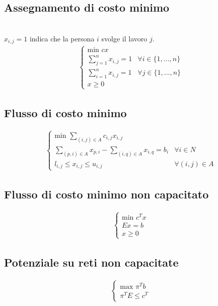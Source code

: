 \documentclass[fleqn,12pt]{article}
\begin{document}
\subsection{Assegnamento di costo minimo} \\
    $x_{i,j} = 1$ indica che la persona $i$ svolge il lavoro $j$.
    \begin{gather*}
    \begin{cases}
        \text{min} \,\, cx \\
        \sum\limits_{j=1}^{n} x_{i,j} = 1 & \forall i \in \{1,...,n\} \\
        \sum\limits_{i=1}^{n} x_{i,j} = 1 & \forall j \in \{1,...,n\} \\
        x \ge 0
    \end{cases}
    \end{gather*}
\subsection{Flusso di costo minimo}
    \begin{gather*}
    \begin{cases}
        \text{min} \,\, \sum\limits_{(i,j) \in A} c_{i,j}x_{i,j} \\
        \sum\limits_{(p,i) \in A} x_{p,i} - \sum\limits_{(i,q) \in A} x_{i,q}
        = b_i & \forall i \in N \\
        l_{i,j} \le x_{i,j} \le u_{i,j} & \forall(i,j) \in A
    \end{cases}
    \end{gather*}
\subsection{Flusso di costo minimo non capacitato}
    \begin{gather*}
    \begin{cases}
        \text{min} \,\, c^Tx \\
        Ex = b \\
        x \ge 0
    \end{cases}
    \end{gather*}
\subsection{Potenziale su reti non capacitate}
    \begin{gather*}
    \begin{cases}
        \text{max} \,\, \pi^Tb \\
        \pi^TE \le c^T
    \end{cases}
    \end{gather*}
\end{document}
